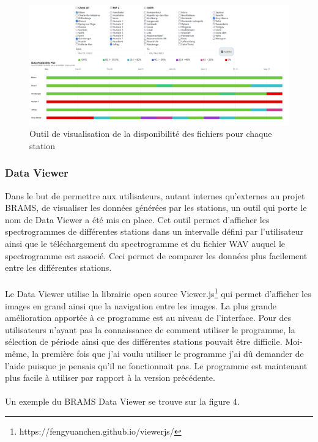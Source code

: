 \documentclass[11pt]{article}
\begin{document}
\begin{figure}[t]
    \begin{center}
        \includegraphics[scale=0.155]{availability.png}
        \caption{Outil de visualisation de la disponibilité des fichiers pour chaque station}
    \end{center}
\end{figure}

\subsubsection{Data Viewer}

Dans le but de permettre aux utilisateurs, autant internes qu'externes au projet BRAMS, de visualiser les données générées par les stations, un outil qui porte le nom de Data Viewer a été mis en place.
Cet outil permet d'afficher les spectrogrammes de différentes stations dans un intervalle défini par l'utilisateur ainsi que le téléchargement du spectrogramme et du fichier WAV auquel le spectrogramme est associé.
Ceci permet de comparer les données plus facilement entre les différentes stations.\\
\\
Le Data Viewer utilise la librairie open source Viewer.js\footnote{https://fengyuanchen.github.io/viewerjs/} qui permet d'afficher les images en grand ainsi que la navigation entre les images.
La plus grande amélioration apportée à ce programme est au niveau de l'interface.
Pour des utilisateurs n'ayant pas la connaissance de comment utiliser le programme, la sélection de période ainsi que des différentes stations pouvait être difficile.
Moi-même, la première fois que j'ai voulu utiliser le programme j'ai dû demander de l'aide puisque je pensais qu'il ne fonctionnait pas.
Le programme est maintenant plus facile à utiliser par rapport à la version précédente.\\
\\
Un exemple du BRAMS Data Viewer se trouve sur la figure 4.
\end{document}
